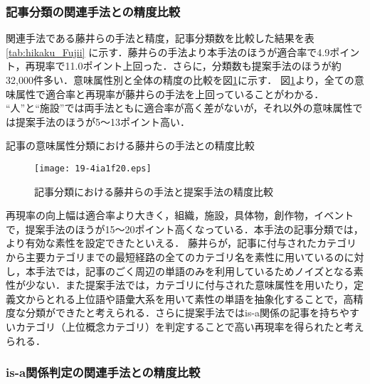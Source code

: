 \documentclass[japanese]{jnlp_1.4}
\begin{document}
\subsubsection{記事分類の関連手法との精度比較}

関連手法である藤井らの手法と精度，記事分類数を比較した結果を表\ref{tab:hikaku_Fujii}
に示す．藤井らの手法より本手法のほうが適合率で4.9ポイント，再現率で11.0ポイント上回った．さらに，分類数も提案手法のほうが約32,000件多い．意味属性別と全体の精度の比較を図\ref{fig:Fujii_hikaku}に示す．
図\ref{fig:Fujii_hikaku}より，全ての意味属性で適合率と再現率が藤井らの手法を上回っていることがわかる．
``人''と``施設''では両手法ともに適合率が高く差がないが，それ以外の意味属性では提案手法のほうが5〜13ポイント高い．

\begin{table}[t]
\caption{記事の意味属性分類における藤井らの手法との精度比較}
\label{tab:hikaku_Fujii}

\end{table}
\begin{figure}[t]
\begin{center}
\texttt{[image: 19-4ia1f20.eps]}
\end{center}
\caption{記事分類における藤井らの手法と提案手法の精度比較}
\label{fig:Fujii_hikaku}
\end{figure}

再現率の向上幅は適合率より大きく，組織，施設，具体物，創作物，イベントで，提案手法のほうが15〜20ポイント高くなっている．本手法の記事分類では，より有効な素性を設定できたといえる．
藤井らが，記事に付与されたカテゴリから主要カテゴリまでの最短経路の全てのカテゴリ名を素性に用いているのに対し，本手法では，記事のごく周辺の単語のみを利用しているためノイズとなる素性が少ない．また提案手法では，カテゴリに付与された意味属性を用いたり，定義文からとれる上位語や語彙大系を用いて素性の単語を抽象化することで，高精度な分類ができたと考えられる．さらに提案手法ではis-a関係の記事を持ちやすいカテゴリ（上位概念カテゴリ）を判定することで高い再現率を得られたと考えられる．


\subsubsection{is-a関係判定の関連手法との精度比較}
\end{document}
